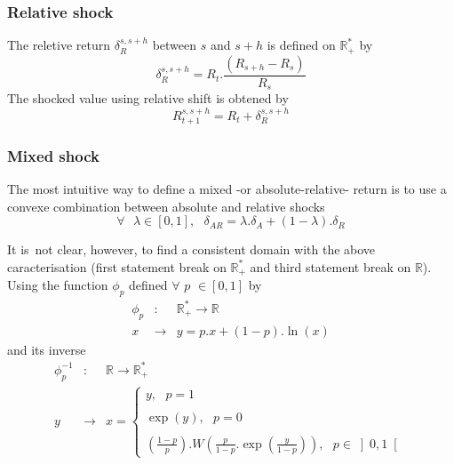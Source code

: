 \documentclass[10pt,a4paper]{report}
\begin{document}
\subsubsection{Relative shock}

The reletive return $\delta _{R}^{s,s+h}$ between $s$ and $s+h$ is defined
on $\mathbb{R}_{+}^{\ast }$ by%
\begin{equation*}
\delta _{R}^{s,s+h}=R_{t}.\frac{\left( R_{s+h}-R_{s}\right) }{R_{s}}
\end{equation*}%
The shocked value using relative shift is obtened by 
\begin{equation*}
R_{t+1}^{s,s+h}=R_{t}+\delta _{R}^{s,s+h}
\end{equation*}

\subsubsection{Mixed shock}

The most intuitive way to define a mixed -or absolute-relative- return is to
use a convexe combination between absolute and relative shocks 
\begin{equation*}
\forall \text{ }\lambda \in \left[ 0,1\right] ,\text{ \ \ }\delta
_{AR}=\lambda .\delta _{A}+(1-\lambda ).\delta _{R}
\end{equation*}

It is\ not clear, however, to find a consistent domain with the above
caracterisation (first statement break on $\mathbb{R}_{+}^{\ast }$ and third
statement break on $\mathbb{R}$). Using the function $\phi _{p}$ defined $%
\forall $ $p$ $\in \left[ 0,1\right] $ by%
\begin{eqnarray*}
\phi _{p} &:&\mathbb{R}_{+}^{\ast }\rightarrow \mathbb{R} \\
x &\rightarrow &y=p.x+(1-p).\ln (x)
\end{eqnarray*}%
and its inverse 
\begin{eqnarray*}
\phi _{p}^{-1} &:&\mathbb{R}\rightarrow \mathbb{R}_{+}^{\ast } \\
y &\rightarrow &x=\left\{ 
\begin{array}{c}
y,\text{ \ \ \ \ \ \ \ \ \ \ \ \ \ \ \ \ \ \ \ \ \ \ \ \ \ \ \ \ \ \ \ \ }p=1
\\ 
\\ 
\exp (y),\text{ \ \ \ \ \ \ \ \ \ \ \ \ \ \ \ \ \ \ \ \ \ \ \ \ \ }p=0 \\ 
\\ 
\left( \frac{1-p}{p}\right) .W\left( \frac{p}{1-p}.\exp \left( \frac{y}{1-p}%
\right) \right) ,\text{ }p\in \left] 0,1\right[%
\end{array}%
\right.
\end{eqnarray*}
\end{document}

